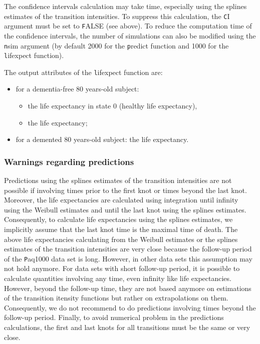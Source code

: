 \documentclass{article}
\newcommand{\code}[1]{{\texttt #1}}
\begin{document}
The confidence intervals calculation may take time, especially using the splines estimates of the transition intensities.
To suppress this calculation, the \code{CI} argument must be set to \code{FALSE} (see above).
To reduce the computation time of the confidence intervals, the number of simulations 
can also be modified using the \code{nsim} argument 
(by default 2000 for the \code{predict} function and 1000 for the \code{lifexpect} function).

The output attributes of  the \code{lifexpect} function are:
\begin{itemize}
\item for a dementia-free 80 years-old subject:
\begin{itemize}
\item the life expectancy in state 0 (healthy life expectancy),
\item the life expectancy;
\end{itemize}
\item for a demented 80 years-old subject: the life expectancy.
\end{itemize}

\subsubsection{Warnings regarding predictions}
\label{sec-5-4-1}
\label{sec:warnings}    
Predictions using the splines estimates of the transition intensities
are not possible if involving times prior to the first knot or times
beyond the last knot.  Moreover, the life expectancies are calculated
using integration until infinity using the Weibull estimates and until
the last knot using the splines estimates.  Consequently, to calculate
life expectancies using the splines estimates, we implicitly assume
that the last knot time is the maximal time of death.  The above life
expectancies calculating from the Weibull estimates or the splines
estimates of the transition intensities are very close because the
follow-up period of the \code{Paq1000} data set is long.  However, in
other data sets this assumption may not hold anymore.  
For data sets with short follow-up period, it is possible 
to calculate quantities involving any time, even infinity like 
life expectancies. However, beyond the follow-up time, they are not 
based anymore
on estimations of the transition itensity functions but rather on 
extrapolations on them. Consequently, we do not recommend to do 
predictions involving times beyond the follow-up period.
Finally, to
avoid numerical problem in the predictions calculations, the first and
last knots  for all transitions must be the same or very close.



\end{document}
